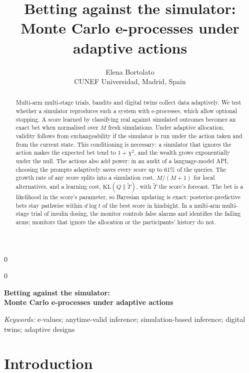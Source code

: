 \documentclass[12pt]{article}
\newcommand{\KL}{\mathrm{KL}}
\theoremstyle{remark}
\newcommand{\blind}{0}
\def\spacingset#1{\renewcommand{\baselinestretch}%
{#1}\small\normalsize} \spacingset{1}
\begin{document}
\blind
{
  \title{\bf Betting against the simulator:\\
  Monte Carlo e-processes under adaptive actions}
  \author{Elena Bortolato\\
    CUNEF Universidad, Madrid, Spain}
  \date{}
  \maketitle
} \fi

\blind
{
  \bigskip
  \bigskip
  \bigskip
  \begin{center}
    {\LARGE\bf Betting against the simulator:\\[4pt]
    Monte Carlo e-processes under adaptive actions}
  \end{center}
  \medskip
} \fi

\bigskip
\begin{abstract}
Multi-arm multi-stage trials, bandits and digital twins collect data
adaptively. We test whether a simulator reproduces such a system with
e-processes, which allow optional stopping. A score learned by classifying real
against simulated outcomes becomes an exact bet when normalised over $M$ fresh
simulations. Under adaptive allocation, validity follows from exchangeability
if the simulator is run under the action taken and from the current state.
This conditioning is necessary: a simulator that ignores the action makes the
expected bet tend to $1+\chi^2$, and the wealth grows exponentially under the
null. The actions also add power: in an audit of a language-model API,
choosing the prompts adaptively saves every score up to 61\% of the queries.
The growth rate of any score splits into a simulation cost, $M/(M+1)$ for local
alternatives, and a learning cost, $\KL(Q\|\tilde T)$, with $\tilde T$ the
score's forecast. The bet is a likelihood in the score's parameter, so Bayesian
updating is exact: posterior-predictive bets stay pathwise within $d\log t$ of
the best score in hindsight. In a multi-arm multi-stage trial of insulin
dosing, the monitor controls false alarms and identifies the failing arms;
monitors that ignore the allocation or the participants' history do not.
\end{abstract}

\noindent%
{\it Keywords:} e-values; anytime-valid inference; simulation-based inference;
digital twins; adaptive designs
\vfill

\newpage
\spacingset{1.45}
\section{Introduction}\label{sec:intro}
\end{document}
